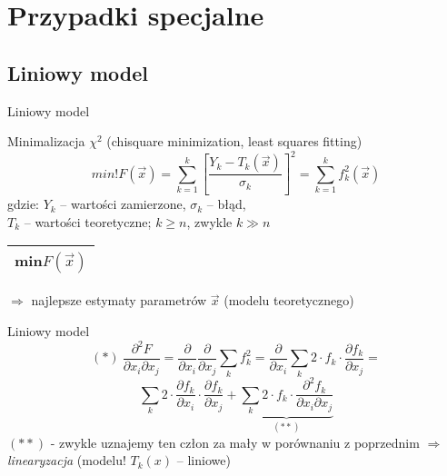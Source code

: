 \section{Przypadki specjalne}

\subsection{Liniowy model}
  \begin{frame}{Liniowy model}
    \begin{block}{Minimalizacja $\chi^{2}$ (chisquare minimization, least squares fitting)}
      \begin{displaymath}
        min!F(\vec{x}) = \sum_{k=1}^{k} \left[ \frac{Y_{k} - T_{k}(\vec{x})}{\sigma_{k}} \right]^{2} = \sum_{k=1}^{k} f_{k}^{2}(\vec{x})
      \end{displaymath}
      gdzie: $Y_{k}$ -- wartości zamierzone, $\sigma_{k}$ -- błąd,\\
      $T_{k}$ -- wartości teoretyczne; $k \geq n$, zwykle $k \gg n$ \\
      \begin{tabular}{|c|} \hline
        min$F(\vec{x})$ \\ \hline
      \end{tabular}
      $\Rightarrow$ najlepsze estymaty parametrów $\vec{x}$
      (modelu teoretycznego)
    \end{block}

  \end{frame}

  \begin{frame}{Liniowy model}
    \begin{equation}
      (*)\ \frac{\partial^2 F}{\partial x_{i} \partial x_{j}} =
      \frac{\partial}{\partial x_{i}} \frac{\partial}{\partial x_{j}}
      \sum_{k} f_{k}^2 = \frac{\partial}{\partial x_{i}}
      \sum_{k} 2 \cdot f_{k} \cdot \frac{\partial f_{k}}{\partial x_{j}} =
      \nonumber
    \end{equation}
    \begin{equation}
      \sum_{k} 2 \cdot \frac{\partial f_{k}}{\partial x_{i}} \cdot
      \frac{\partial f_{k}}{\partial x_{j}} +
      \underbrace{
        \sum_{k} 2 \cdot f_{k} \cdot
        \frac{\partial^2 f_{k}}{\partial x_{i} \partial x_{j}}
      }_{(**)}
      \nonumber
    \end{equation}
    $(**)$ - zwykle uznajemy ten człon za mały w porównaniu
    z poprzednim
    $\Rightarrow$ \emph{linearyzacja} (modelu! $T_{k}(x)$ -- liniowe)
  \end{frame}

